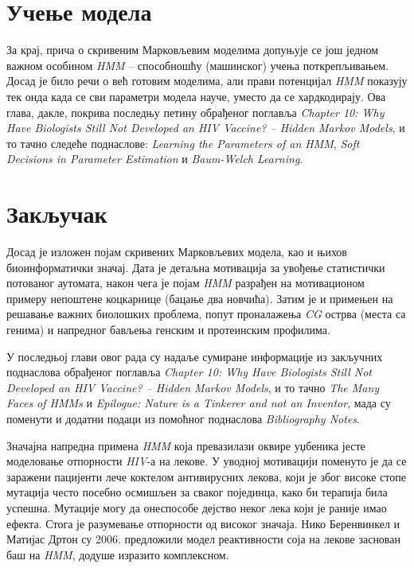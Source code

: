 \documentclass[12pt,oneside]{memoir}
\begin{document}
\begin{CJK}{UTF8}{ipxm}
\chapter{Учење модела}
За крај, прича о скривеним Марковљевим моделима допуњује се још једном важном особином \textit{HMM} -- способношћу (машинског) учења поткрепљивањем. Досад је било речи о већ готовим моделима, али прави потенцијал \textit{HMM} показују тек онда када се сви параметри модела науче, уместо да се хардкодирају. Ова глава, дакле, покрива последњу петину обрађеног поглавља \textit{Chapter 10: Why Have Biologists Still Not Developed an HIV Vaccine? -- Hidden Markov Models}, и то тачно следеће поднаслове: \textit{Learning the Parameters of an HMM}, \textit{Soft Decisions in Parameter Estimation} и \textit{Baum-Welch Learning}.


\chapter{Закључак}
Досад је изложен појам скривених Марковљевих модела, као и њихов биоинформатички значај. Дата је детаљна мотивација за увођење статистички потованог аутомата, након чега је појам \textit{HMM} разрађен на мотивационом примеру непоштене коцкарнице (бацање два новчића). Затим је и примењен на решавање важних биолошких проблема, попут проналажења \textit{CG} острва (места са генима) и напредног бављења генским и протеинским профилима.

У последњој глави овог рада су надаље сумиране информације из закључних поднаслова обрађеног поглавља \textit{Chapter 10: Why Have Biologists Still Not Developed an HIV Vaccine? -- Hidden Markov Models}, и то тачно \textit{The Many Faces of HMMs} и \textit{Epilogue: Nature is a Tinkerer and not an Inventor}, мада су поменути и додатни подаци из помоћног поднаслова \textit{Bibliography Notes}.

Значајна напредна примена \textit{HMM} која превазилази оквире уџбеника јесте моделовање отпорности \textit{HIV}-а на лекове. У уводној мотивацији поменуто је да се заражени пацијенти лече коктелом антивирусних лекова, који је због високе стопе мутација често посебно осмишљен за сваког појединца, како би терапија била успешна. Мутације могу да онеспособе дејство неког лека који је раније имао ефекта. Стога је разумевање отпорности од високог значаја. Нико Беренвинкел и Матијас Дртон су 2006. предложили модел реактивности соја на лекове заснован баш на \textit{HMM}, додуше изразито комплексном\cite{beerenwinkel2007}.


\end{CJK}
\end{document}
